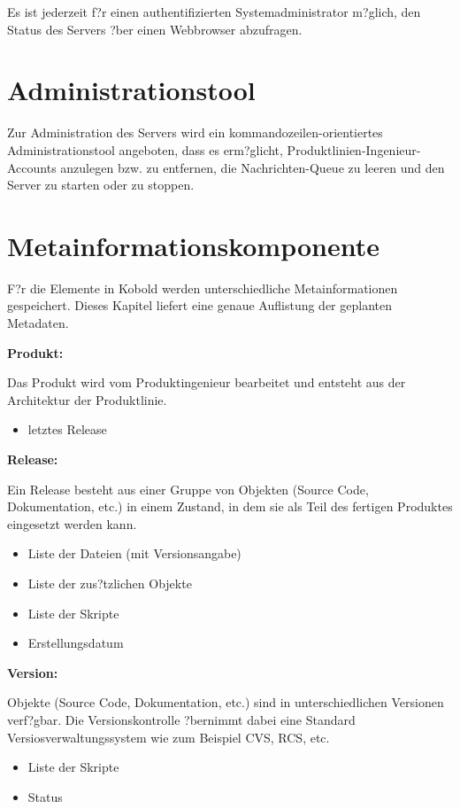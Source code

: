 Es ist jederzeit f?r einen authentifizierten Systemadministrator m?glich,
den Status des Servers ?ber einen Webbrowser abzufragen.

\section{Administrationstool}

Zur Administration des Servers wird ein kommandozeilen-orientiertes 
Administrationstool angeboten, dass es erm?glicht, Produktlinien-Ingenieur-Accounts
anzulegen bzw. zu entfernen, die Nachrichten-Queue zu
leeren und den Server zu starten oder zu stoppen.


\section{Metainformationskomponente}

F?r die Elemente in Kobold werden unterschiedliche Metainformationen gespeichert. Dieses Kapitel liefert eine genaue Auflistung der geplanten Metadaten.\newline

\textbf{Produkt:}\par
Das Produkt wird vom Produktingenieur bearbeitet und entsteht aus der Architektur der Produktlinie. 
\begin{itemize}
\item letztes Release\newline
\end{itemize}

\textbf{Release:}\par
Ein Release besteht aus einer Gruppe von Objekten (Source Code, Dokumentation, etc.) in einem Zustand, in dem sie als Teil des fertigen Produktes eingesetzt werden kann.
\begin{itemize}
\item Liste der Dateien (mit Versionsangabe)
\item Liste der zus?tzlichen Objekte
\item Liste der Skripte
\item Erstellungsdatum\newline
\end{itemize}

\textbf{Version:}\par
Objekte (Source Code, Dokumentation, etc.) sind in unterschiedlichen Versionen verf?gbar. Die Versionskontrolle ?bernimmt dabei eine Standard Versiosverwaltungssystem wie zum Beispiel CVS, RCS, etc.
\begin{itemize}
\item Liste der Skripte
\item Status\newline
\end{itemize}

